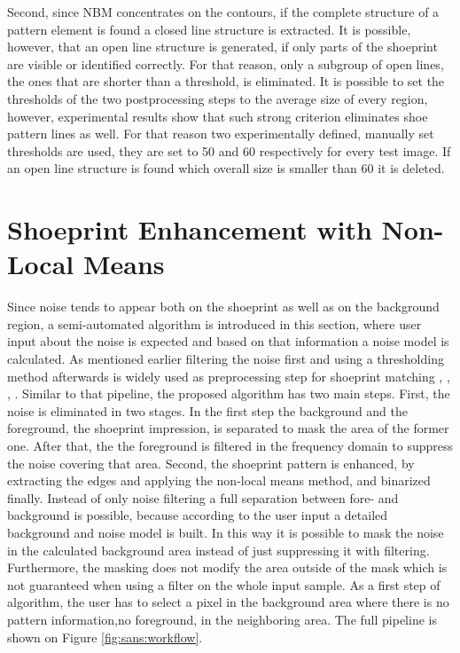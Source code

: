 \documentclass[draft,final]{vutinfth} %
\begin{document}
Second, since NBM concentrates on the contours, if the complete structure of a pattern element is found a closed line structure is extracted.
It is possible, however, that an open line structure is generated,  if only parts of the shoeprint are visible or identified correctly.
For that reason, only a subgroup of open lines, the ones that are shorter than a threshold, is eliminated.
It is possible to set the thresholds of the two postprocessing steps to the average size of every region, however, experimental results show that such strong criterion eliminates shoe pattern lines as well.
For that reason two experimentally defined, manually set thresholds are used, they are set to 50 and 60 respectively for every test image.
If an open line structure is found which overall size is smaller than 60 it is deleted.

\section{Shoeprint Enhancement with Non-Local Means}
\par
Since noise tends to appear both on the shoeprint as well as on the background region, a semi-automated algorithm is introduced in this section, where user input about the noise is expected and based on that information a noise model is calculated.
As mentioned earlier filtering the noise first and using a thresholding method afterwards is widely used as preprocessing step for shoeprint matching \cite{alizadeh2017automatic}, \cite{wang2014automatic}, \cite{li2014retrieval}, \cite{kong2014novel}.
Similar to that pipeline, the proposed algorithm has two main steps.
First, the noise is eliminated in two stages.
In the first step the background and the foreground, the shoeprint impression, is separated to mask the area of the former one.
After that, the the foreground is filtered in the frequency domain to suppress  the noise covering that area.
Second, the shoeprint pattern is enhanced, by extracting the edges and applying the non-local means method, and binarized finally.
Instead of only noise filtering a full separation between fore- and background is possible, because according to the user input a detailed background and noise model is built.
In this way it is possible to mask the noise in the calculated background area instead of just suppressing it with filtering.
Furthermore, the masking does not modify the area outside of the mask which is not guaranteed when using a filter on the whole input sample.
As a first step of algorithm, the user has to select a pixel in the background area where there is no pattern information,no foreground, in the neighboring area.
The full pipeline is shown on Figure \ref{fig:sans:workflow}.
\end{document}
